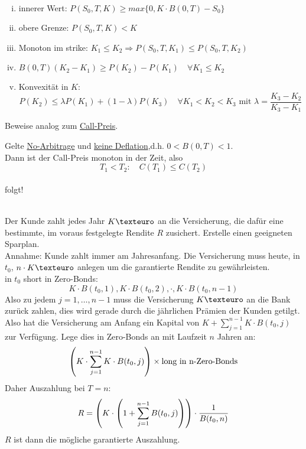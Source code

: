 \\
\begin{enumerate}[(i)]
	\item innerer Wert: $P(S_0,T,K)\ge max\{0,K\cdot B(0,T)-S_0\}$
	\item obere Grenze: $P(S_0,T,K)<K$
	\item Monoton im strike: $K_1\le K_2\Rightarrow P(S_0,T,K_1)\le P(S_0,T,K_2)$
	\item $B(0,T)(K_2-K_1)\ge P(K_2)-P(K_1)\quad \forall K_1\le K_2$
	\item Konvexität in $K$: 
	\[ P(K_2)\le \lambda P(K_1)+(1-\lambda)P(K_3)\quad \forall K_1<K_2<K_3\text{ mit } \lambda=\frac{K_3-K_2}{K_3-K_1} \]
\end{enumerate}
Beweise analog zum \hyperref[sub:call-preis]{Call-Preis}.

Gelte \uline{No-Arbitrage} und \uline{keine Deflation},d.h. $0<B(0,T)<1$.\\
Dann ist der Call-Preis monoton in der Zeit, also \[ T_1<T_2:\quad C(T_1)\le C(T_2) \]
\\
folgt!

\\
Der Kunde zahlt jedes Jahr $K \texteuro$ an die Versicherung, die dafür eine bestimmte, im voraus festgelegte Rendite $R$ zusichert. Erstelle einen geeigneten Sparplan.\\
Annahme: Kunde zahlt immer am Jahresanfang. Die Versicherung muss heute, in $t_0$, $n\cdot K \texteuro$ anlegen um die garantierte Rendite zu gewährleisten.\\
in $t_0$ short in Zero-Bonds: \[ K\cdot B(t_0,1), K\cdot B(t_0,2), \cdot, K\cdot B(t_0,n-1) \]
Also zu jedem $j=1,\dots,n-1$ muss die Versicherung $K\texteuro$ an die Bank zurück zahlen, dies wird gerade durch die jährlichen Prämien der Kunden getilgt.\\
Also hat die Versicherung am Anfang ein Kapital von $K+\sum_{j=1}^{n-1}K\cdot B(t_0,j)$ zur Verfügung. Lege dies in Zero-Bonds an mit Laufzeit $n$ Jahren an: \[ \left( K\cdot \sum_{j=1}^{n-1}K\cdot B(t_0,j)\right)\times \text{long in n-Zero-Bonds} \]
Daher Auszahlung bei $T=n$: \[ R=\left( K\cdot \left( 1+\sum_{j=1}^{n-1}B(t_0,j)\right)\right)\cdot \frac{1}{B(t_0,n)} \]
$R$ ist dann die mögliche garantierte Auszahlung.